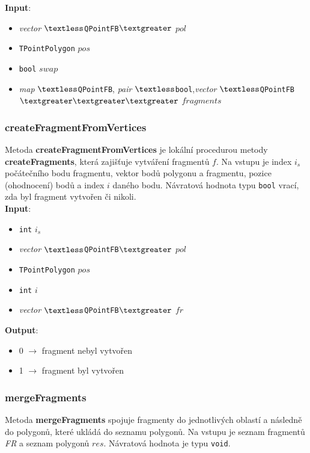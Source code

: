 \documentclass[a4paper, 12pt]{article}
\begin{document}
\textbf{Input}:
\begin{itemize}
\item \textsl{vector} $\textless$\texttt{QPointFB}$\textgreater$ $pol$
\item \texttt{TPointPolygon} $pos$
\item \texttt{bool} $swap$
\item \textsl{map} $\textless$\texttt{QPointFB}, \textsl{pair} $\textless$\texttt{bool},\textsl{vector} $\textless$\texttt{QPointFB}$\textgreater \textgreater \textgreater$ $fragments$
\end{itemize}

\subsubsection*{createFragmentFromVertices}
Metoda \textbf{createFragmentFromVertices} je lokální procedurou metody \textbf{createFragments}, která zajišťuje vytváření fragmentů $f$. Na vstupu je index $i_s$ počátečního bodu fragmentu, vektor bodů polygonu a fragmentu, pozice (ohodnocení) bodů a index $i$ daného bodu. Návratová hodnota typu \texttt{bool} vrací, zda byl fragment vytvořen či nikoli.\\ 

\textbf{Input}:
\begin{itemize}
\item \texttt{int} $i_s$ 
\item \textsl{vector} $\textless$\texttt{QPointFB}$\textgreater$ $pol$
\item \texttt{TPointPolygon} $pos$
\item \texttt{int} $i$ 
\item \textsl{vector} $\textless$\texttt{QPointFB}$\textgreater$ $fr$
\end{itemize}

\textbf{Output}:
\begin{itemize}
\item 0 $\rightarrow$ fragment nebyl vytvořen 
\item 1 $\rightarrow$ fragment byl vytvořen 
\end{itemize}

\subsubsection*{mergeFragments}
Metoda \textbf{mergeFragments} spojuje fragmenty do jednotlivých oblastí a následně do polygonů, které ukládá do seznamu polygonů. Na vstupu je seznam fragmentů \textit{FR} a sez\-nam polygonů $res$. Návratová hodnota je typu \texttt{void}.\\ 
\end{document}

